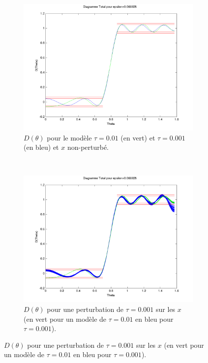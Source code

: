 \begin{figure}[h!]
  \centering
  \begin{subfigure}[b]{0.45\textwidth}
  \includegraphics[width=\textwidth]{D-ModRobust1.png}
  \caption{$D(\theta)$ pour le modèle $\tau = 0.01$ (en vert) et $\tau = 0.001$ (en bleu) et $x$ non-perturbé.}
  \label{fig:D-ModRobust1}
  \end{subfigure}
  ~ 
 \begin{subfigure}[b]{0.45\textwidth}
  \includegraphics[width=\textwidth]{D-ModRobust1-test3Rob001.png}
  \caption{$D(\theta)$ pour une perturbation de $\tau = 0.001$ sur les $x$ (en vert pour un modèle de $\tau=0.01$ en bleu pour $\tau=0.001$).}
  \label{fig:D-ModRobust1-test3RobTau001}

\end{subfigure}
\end{figure}

